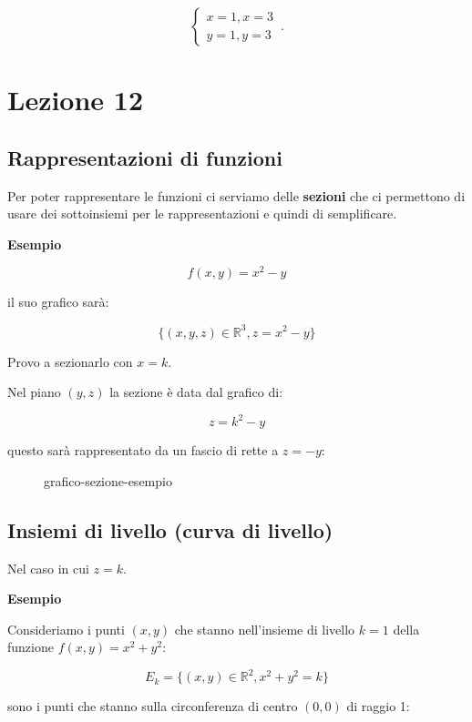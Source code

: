 \documentclass[11pt]{article}
\begin{document}
\begin{equation}
    \begin{cases}
           x=1,x=3\\
           y=1,y=3
    \end{cases}\,.
\end{equation}

\section{Lezione 12}

\subsection{Rappresentazioni di funzioni}

Per poter rappresentare le funzioni ci serviamo delle \textbf{sezioni} che ci permettono di usare dei sottoinsiemi per le rappresentazioni e quindi di semplificare.

\textbf{Esempio} 

\[
    f(x,y)=x^{2}-y
\]

il suo grafico sarà:

\[
    \{(x,y,z) \in \mathbb{R}^{3},z=x^{2}-y\}
\]

Provo a sezionarlo con $x=k$.

Nel piano $(y,z)$ la sezione è data dal grafico di:

\[
    z= k^{2}-y
\]

questo sarà rappresentato da un fascio di rette a $z=-y$:

\begin{figure}[ht]
    \centering
    \caption{grafico-sezione-esempio}
    \label{fig:grafico-sezione-esempio}
\end{figure}


\subsection{Insiemi di livello (curva di livello)}

Nel caso in cui $z=k$.

\textbf{Esempio} 

Consideriamo i punti $(x,y)$ che stanno nell'insieme di livello $k=1$ della funzione $f(x,y)=x^{2}+y^{2}$:

\[
    E_k = \{(x,y) \in \mathbb{R}^{2},x^{2}+y^{2}=k\}
\]

sono i punti che stanno sulla circonferenza di centro $(0,0)$ di raggio 1:
\end{document}
